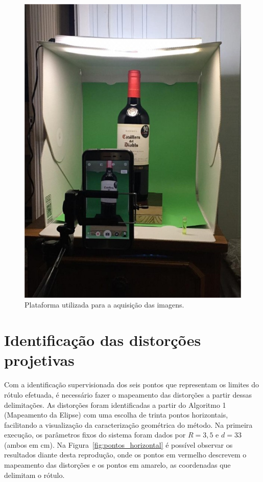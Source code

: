 \begin{figure}[htb]
    \caption{Plataforma utilizada para a aquisição das imagens. }
    \centering
    \vspace{.3cm}
    \begin{minipage}{.4\textwidth}
            \includegraphics[width=\textwidth]{TCC/Imagens/plataforma.jpg}
	\end{minipage}
    \label{fig:plataforma}
\end{figure}

\section{Identificação das distorções projetivas}

Com a identificação supervisionada dos seis pontos que representam os limites do rótulo efetuada, é necessário fazer o mapeamento das distorções a partir dessas delimitações. As distorções foram identificadas a partir do Algoritmo 1 (Mapeamento da Elipse) com uma escolha de trinta pontos horizontais, facilitando a visualização da caracterização geométrica do método. Na primeira execução, os parâmetros fixos do sistema foram dados por $R = 3,\!5$  e $d= 33$  (ambos em cm). Na Figura~\ref{fig:pontos_horizontal} é possível observar os resultados diante desta reprodução, onde os pontos em vermelho descrevem o mapeamento das distorções e os pontos em amarelo, as coordenadas que delimitam o rótulo.

